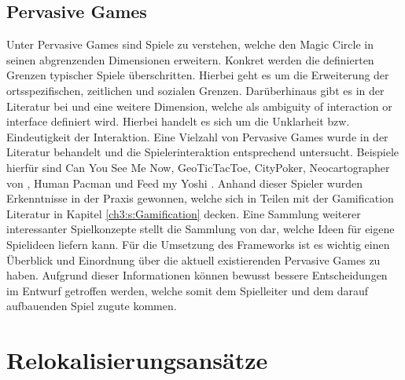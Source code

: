 \subsection*{Pervasive Games}

Unter Pervasive Games sind Spiele zu verstehen, welche den Magic Circle in seinen abgrenzenden Dimensionen erweitern.
Konkret werden die definierten Grenzen typischer Spiele überschritten.\cite{Montola.2005}
Hierbei geht es um die Erweiterung der ortsspezifischen, zeitlichen und sozialen Grenzen.\cite{Montola.2009}
Darüberhinaus gibt es in der Literatur bei \textcite{Nieuwdorp.2007} und \textcite{Bjork.2007} eine weitere Dimension, welche als \glqq ambiguity 
of interaction or interface\grqq{} definiert wird. Hierbei handelt es sich um die Unklarheit bzw. Eindeutigkeit der Interaktion.
Eine Vielzahl von Pervasive Games wurde in der Literatur behandelt und die Spielerinteraktion entsprechend untersucht.
Beispiele hierfür sind Can You See Me Now,\cite{Flintham.2003} GeoTicTacToe, CityPoker, Neocartographer von \textcite{Schlieder.2005}, Human Pacman \cite{Cheok.2003} und Feed my Yoshi \cite{Bell.2006}.
Anhand dieser Spieler wurden Erkenntnisse in der Praxis gewonnen, welche sich in Teilen mit der Gamification Literatur in Kapitel \ref{ch3:s:Gamification} decken.
Eine Sammlung weiterer interessanter Spielkonzepte stellt die Sammlung von \textcite{Hinske.2007} dar, welche Ideen für eigene Spielideen liefern kann.
Für die Umsetzung des Frameworks ist es wichtig einen Überblick und Einordnung über die aktuell existierenden Pervasive Games zu haben. Aufgrund dieser Informationen können bewusst bessere Entscheidungen im Entwurf getroffen werden, welche somit dem Spielleiter und dem darauf aufbauenden Spiel zugute kommen.


\section{Relokalisierungsansätze}
\label{ch3:s:Relokalisierung}

